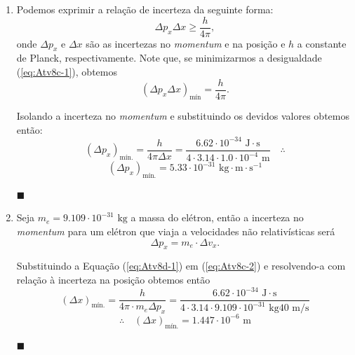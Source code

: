 \documentclass[12pt,a4paper]{article}
\begin{document}
\begin{enumerate}[label = \alph*)]
        
        \item Podemos exprimir a relação de incerteza da seguinte forma:
        \begin{equation}\label{eq:Atv8c-1}
            \Delta p_x\Delta  x\geq\frac{h}{4\pi},
        \end{equation}
        onde $\Delta p_x$ e $\Delta x$ são as incertezas no \textit{momentum} e na posição e $h$ a constante de Planck, respectivamente. Note que, se minimizarmos a desigualdade (\ref{eq:Atv8c-1}), obtemos 
        \begin{equation}\label{eq:Atv8c-2}
            \left(\Delta p_x\Delta x\right)_{\text{mín}}=\frac{h}{4\pi}.
        \end{equation}

        Isolando a incerteza no \textit{momentum} e substituindo os devidos valores obtemos então:
        \begin{equation*}
            \left(\Delta p_x\right)_{\text{mín.}}=\frac{h}{4\pi\Delta x}=\frac{6.62\cdot10^{-34}\text{ J}\cdot\text{s}}{4\cdot3.14\cdot1.0\cdot10^{-4}\text{ m}}\quad\therefore
        \end{equation*}
        \begin{equation}\label{eq:Atv8c-3}
            \boxed{\left(\Delta p_x\right)_{\text{mín.}}=5.33\cdot10^{-31}\text{ kg}\cdot\text{m}\cdot\text{s}^{-1}}
        \end{equation}
        \begin{flushright}
            $\blacksquare$
        \end{flushright}
        
        \item Seja $m_e=9.109\cdot10^{-31}\text{ kg}$ a massa do elétron, então a incerteza no \textit{momentum} para um elétron que viaja a velocidades não relativísticas será
        \begin{equation}\label{eq:Atv8d-1}
            \Delta p_x=m_e\cdot\Delta v_x.
        \end{equation}

        Substituindo a Equação (\ref{eq:Atv8d-1}) em (\ref{eq:Atv8c-2}) e resolvendo-a com relação à incerteza na posição obtemos então
        \begin{equation*}
            \left(\Delta x\right)_{\text{mín.}}=\frac{h}{4\pi\cdot m_e\Delta p_x}=\frac{6.62\cdot10^{-34}\text{ J}\cdot\text{s}}{4\cdot3.14\cdot9.109\cdot10^{-31}\text{ kg}40\text{ m/s}}
        \end{equation*}
        \begin{equation}\label{eq:Atv8d-2}
            \therefore\quad\boxed{\left(\Delta x\right)_{\text{mín.}}=1.447\cdot10^{-6}\text{ m}}
        \end{equation}
        \begin{flushright}
            $\blacksquare$
        \end{flushright}



\end{enumerate}
\end{document}
